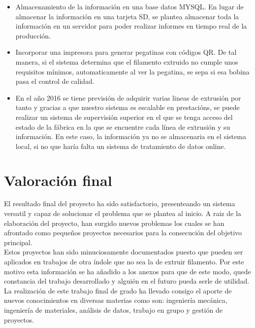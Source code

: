 \begin{itemize}
	\item{Almacenamiento de la información en una base datos MYSQL. En lugar de almacenar la información en una tarjeta SD, se plantea almacenar toda la información en un servidor para poder realizar informes en tiempo real de la producción.}
	\item{Incorporar una impresora para generar pegatinas con códigos QR. De tal manera, si el sistema determina que el filamento extruido no cumple unos requisitos mínimos, automaticamente al ver la pegatina, se sepa si esa bobina pasa el control de calidad.}
	\item{En el año 2016 se tiene previsión de adquirir varias lineas de extrusión por tanto y gracias a que nuestro sistema es escalable en prestacións, se puede realizar un sistema de supervisión superior en el que se tenga acceso del estado de la fábrica en la que se encuentre cada línea de extrusión y su información. En este caso, la información ya no se almacenaria en el sistema local, si no que haría falta un sistema de tratamiento de datos online.}

\end{itemize}

\section{Valoración final}

El resultado final del proyecto ha sido satisfactorio, presenteando un sistema versatil y capaz de solucionar el problema que se plantea al inicio. A raiz de la elaboración del proyecto, han surgido nuevos problemas los cuales se han afrontado como pequeños proyectos necesarios para la consecución del objetivo principal.\\

Estos proyectos han sido minuciosamente documentados puesto que pueden ser aplicados en trabajos de otra índole que no sea la de extruir filamento. Por este motivo esta información se ha añadido a los anexos para que de este modo, quede constancia del trabajo desarrollado y alguién en el futuro pueda serle de utilidad.\\

La realización de este trabajo final de grado ha llevado consigo el aporte de nuevos conocimientos en diversas materias como son: ingeniería mecánica, ingeniería de materiales, análisis de datos, trabajo en grupo y gestión de proyectos.